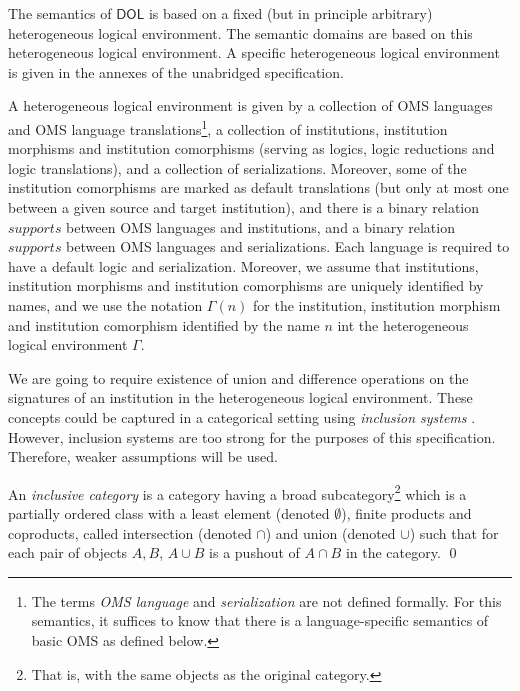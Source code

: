 \documentclass[10pt, a4paper]{isov2}
\newcommand*{\termref}[1]{\index{#1}#1\xspace}
\newcommand*{\DOL}{\ensuremath{\mathsf{DOL}}\xspace}
\begin{document}

\sclause{Semantics of \DOL Language Constructs}\label{c:direct-sematics}

The semantics of \DOL is based on a fixed (but in principle arbitrary) heterogeneous logical
environment.  The semantic domains are based on this heterogeneous logical environment.
A specific heterogeneous logical environment is given in the annexes of the unabridged specification.

A heterogeneous logical environment is given by a collection of
OMS languages and OMS language translations\footnote{The
  terms \emph{OMS language} and \emph{serialization} are not
  defined formally. For this semantics, it suffices to know that there
  is a language-specific semantics of basic OMS as defined
  below.}, a collection of institutions, \termref{institution} morphisms and
institution comorphisms (serving as logics, logic reductions and logic
translations), and a collection of serializations. Moreover, some of the institution comorphisms are marked as default translations (but only at most one between a given source and target institution), and there is
a binary relation $\mathit{supports}$ between OMS languages and institutions,
and a binary relation $\mathit{supports}$ between OMS languages and
serializations.
 Each language is required to have a default logic and serialization. Moreover, we assume
 that institutions, institution morphisms and institution comorphisms
 are uniquely identified by names, and we use
 the notation $\Gamma(n)$ for the institution, institution morphism and institution comorphism identified by the name $n$ int the heterogeneous logical environment $\Gamma$.

We are going to require existence of union and difference operations on the signatures
of an institution in the heterogeneous logical environment.
These concepts could be captured in a categorical setting using \emph{inclusion systems} \cite{DGS91}.
 However, inclusion systems are too strong for the purposes of this specification.  Therefore, weaker assumptions will be used.

\begin{definition}
 An \emph{inclusive category} \cite{DBLP:conf/birthday/GoguenR04}
 is a category having a broad subcategory\footnote{That is, with the same objects as the original category.}
which is a partially ordered class with
a least element (denoted $\emptyset$),
finite products and coproducts, called intersection (denoted $\cap$) and union
(denoted $\cup$) such that for each pair of objects $A, B$, $A \cup B$ is a pushout of $A \cap B$ in the category.
\qed \end{definition}
\end{document}

